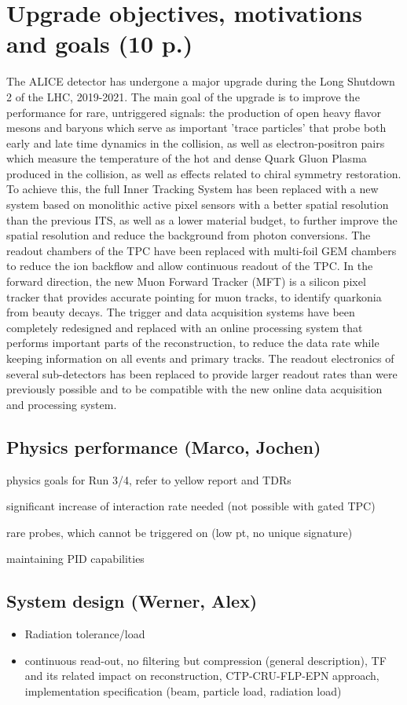 \section{Upgrade objectives, motivations and goals (10 p.)}

The ALICE detector has undergone a major upgrade during the Long Shutdown 2 of the LHC, 2019-2021.
The main goal of the upgrade is to improve the performance for rare, untriggered signals: the production of open heavy flavor mesons and baryons which serve as important 'trace particles' that probe both early and late time dynamics in the collision, as well as electron-positron pairs which measure the temperature of the hot and dense Quark Gluon Plasma produced in the collision, as well as effects related to chiral symmetry restoration.
To achieve this, the full Inner Tracking System has been replaced with a new system based on monolithic active pixel sensors with a better spatial resolution than the previous ITS, as well as a lower material budget, to further improve the spatial resolution and reduce the background from photon conversions. The readout chambers of the TPC have been replaced with multi-foil GEM chambers to reduce the ion backflow and allow continuous readout of the TPC.
In the forward direction, the new Muon Forward Tracker (MFT) is a silicon pixel tracker that provides accurate pointing for muon tracks, to identify quarkonia from beauty decays.
The trigger and data acquisition systems have been completely redesigned and replaced with an online processing system that performs important parts of the reconstruction, to reduce the data rate while keeping information on all events and primary tracks. The readout electronics of several sub-detectors has been replaced to provide larger readout rates than were previously possible and to be compatible with the new online data acquisition and processing system. 

\subsection{Physics performance (Marco, Jochen)}

physics goals for Run 3/4, refer to yellow report and TDRs~\cite{Citron:2018lsq}

significant increase of interaction rate needed (not possible with gated TPC)

rare probes, which cannot be triggered on (low pt, no unique signature)

maintaining PID capabilities

\subsection{System design (Werner, Alex)}
\begin{itemize}
\item Radiation tolerance/load
\item continuous read-out, no filtering but compression (general description), TF and its related impact on reconstruction, CTP-CRU-FLP-EPN approach, implementation specification (beam, particle load, radiation load)
\end{itemize}
